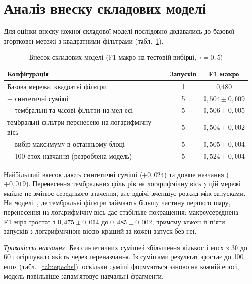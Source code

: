 \section{Аналіз внеску складових моделі}
\label{sec:ablation}

Для оцінки внеску кожної складової моделі послідовно додавались до
базової згорткової мережі з квадратними фільтрами
(табл.~\ref{tab:ablation}).

\begin{table}[H]
\centering
\caption{Внесок складових моделі (F1 макро на тестовій вибірці, $\tau = 0{,}5$)}
\label{tab:ablation}
\begin{tabular}{|l|c|c|}
\hline
Конфігурація & Запусків & F1 макро \\
\hline
Базова мережа, квадратні фільтри                        & 1 & 0,480 \\
+ синтетичні суміші                                      & 5 & $0{,}504 \pm 0{,}009$ \\
+ тембральні та часові фільтри на мел-осі                & 5 & $0{,}506 \pm 0{,}005$ \\
тембральні фільтри перенесено на логарифмічну вісь        & 5 & $0{,}504 \pm 0{,}002$ \\
+ вибір максимуму в останньому блоці                     & 5 & $0{,}505 \pm 0{,}004$ \\
+ 100 епох навчання (розроблена модель)               & 5 & $0{,}524 \pm 0{,}004$ \\
\hline
\end{tabular}
\end{table}

Найбільший внесок дають синтетичні суміші ($+0{,}024$) та довше
навчання ($+0{,}019$). Перенесення тембральних фільтрів на логарифмічну
вісь у цій мережі майже не змінює середнього значення, але вдвічі
зменшує розкид між запусками. На моделі~\cite{pons2017}, де тембральні
фільтри займають більшу частину першого шару, перенесення на
логарифмічну вісь дає стабільне покращення: макроусереднена F1-міра зростає
з $0{,}475 \pm 0{,}004$ до $0{,}485 \pm 0{,}002$, причому кожен із п'яти
запусків з логарифмічною віссю кращий за кожен запуск без неї.

\textit{Тривалість навчання.} Без синтетичних сумішей збільшення кількості
епох з 30 до 60 погіршувало якість через перенавчання. Із сумішами
результат зростає до 100 епох (табл.~\ref{tab:epochs}): оскільки суміші
формуються заново на кожній епосі, модель повільніше запам'ятовує
навчальні фрагменти.

